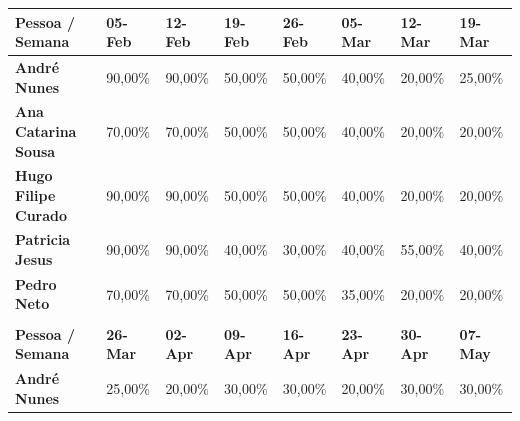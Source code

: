 \documentclass[a4paper]{report}
\begin{document}
\begin{table}[h]
\centering
\begin{tabular}{llllllll}
\multicolumn{1}{l|}{\textbf{Pessoa / Semana}} & \multicolumn{1}{l|}{\textbf{05-Feb}} & \multicolumn{1}{l|}{\textbf{12-Feb}} & \multicolumn{1}{l|}{\textbf{19-Feb}} & \multicolumn{1}{l|}{\textbf{26-Feb}} & \multicolumn{1}{l|}{\textbf{05-Mar}} & \multicolumn{1}{l|}{\textbf{12-Mar}} & \textbf{19-Mar} \\ \hline
\multicolumn{1}{l|}{\textbf{André Nunes}} & \multicolumn{1}{l|}{90,00\%} & \multicolumn{1}{l|}{90,00\%} & \multicolumn{1}{l|}{50,00\%} & \multicolumn{1}{l|}{50,00\%} & \multicolumn{1}{l|}{40,00\%} & \multicolumn{1}{l|}{20,00\%} & 25,00\% \\ \hline
\multicolumn{1}{l|}{\textbf{Ana Catarina Sousa}} & \multicolumn{1}{l|}{70,00\%} & \multicolumn{1}{l|}{70,00\%} & \multicolumn{1}{l|}{50,00\%} & \multicolumn{1}{l|}{50,00\%} & \multicolumn{1}{l|}{40,00\%} & \multicolumn{1}{l|}{20,00\%} & 20,00\% \\ \hline
\multicolumn{1}{l|}{\textbf{Hugo Filipe Curado}} & \multicolumn{1}{l|}{90,00\%} & \multicolumn{1}{l|}{90,00\%} & \multicolumn{1}{l|}{50,00\%} & \multicolumn{1}{l|}{50,00\%} & \multicolumn{1}{l|}{40,00\%} & \multicolumn{1}{l|}{20,00\%} & 20,00\% \\ \hline
\multicolumn{1}{l|}{\textbf{Patricia Jesus}} & \multicolumn{1}{l|}{90,00\%} & \multicolumn{1}{l|}{90,00\%} & \multicolumn{1}{l|}{40,00\%} & \multicolumn{1}{l|}{30,00\%} & \multicolumn{1}{l|}{40,00\%} & \multicolumn{1}{l|}{55,00\%} & 40,00\% \\ \hline
\multicolumn{1}{l|}{\textbf{Pedro Neto}} & \multicolumn{1}{l|}{70,00\%} & \multicolumn{1}{l|}{70,00\%} & \multicolumn{1}{l|}{50,00\%} & \multicolumn{1}{l|}{50,00\%} & \multicolumn{1}{l|}{35,00\%} & \multicolumn{1}{l|}{20,00\%} & 20,00\% \\
\textbf{} &  &  &  &  &  &  &  \\
\multicolumn{1}{l|}{\textbf{Pessoa / Semana}} & \multicolumn{1}{l|}{\textbf{26-Mar}} & \multicolumn{1}{l|}{\textbf{02-Apr}} & \multicolumn{1}{l|}{\textbf{09-Apr}} & \multicolumn{1}{l|}{\textbf{16-Apr}} & \multicolumn{1}{l|}{\textbf{23-Apr}} & \multicolumn{1}{l|}{\textbf{30-Apr}} & \textbf{07-May} \\ \hline
\multicolumn{1}{l|}{\textbf{André Nunes}} & \multicolumn{1}{l|}{25,00\%} & \multicolumn{1}{l|}{20,00\%} & \multicolumn{1}{l|}{30,00\%} & \multicolumn{1}{l|}{30,00\%} & \multicolumn{1}{l|}{20,00\%} & \multicolumn{1}{l|}{30,00\%} & 30,00\% \\ \hline

\end{tabular}
\end{table}
\end{document}
